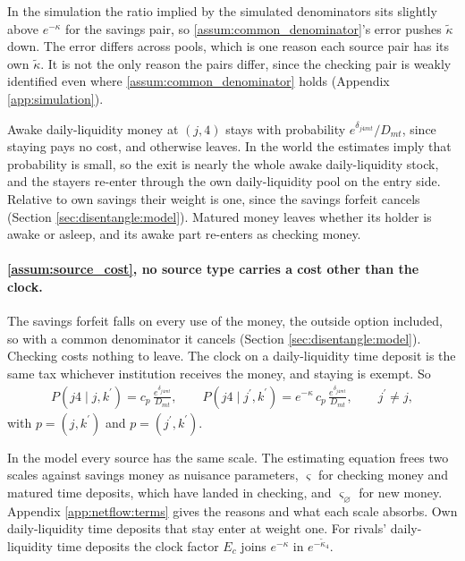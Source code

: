 In the simulation the ratio implied by the simulated denominators sits slightly above $e^{-\kappa}$ for the savings pair, so \ref{assum:common_denominator}'s error pushes $\tilde{\kappa}$ down. The error differs across pools, which is one reason each source pair has its own $\tilde{\kappa}$. It is not the only reason the pairs differ, since the checking pair is weakly identified even where \ref{assum:common_denominator} holds (Appendix \ref{app:simulation}).

Awake daily-liquidity money at $(j,4)$ stays with probability $e^{\delta_{j4mt}}/D_{mt}$, since staying pays no cost, and otherwise leaves. In the world the estimates imply that probability is small, so the exit is nearly the whole awake daily-liquidity stock, and the stayers re-enter through the own daily-liquidity pool on the entry side. Relative to own savings their weight is one, since the savings forfeit cancels (Section \ref{sec:disentangle:model}). Matured money leaves whether its holder is awake or asleep, and its awake part re-enters as checking money.

\paragraph{\ref{assum:source_cost}, no source type carries a cost other than the clock.} The savings forfeit falls on every use of the money, the outside option included, so with a common denominator it cancels (Section \ref{sec:disentangle:model}). Checking costs nothing to leave. The clock on a daily-liquidity time deposit is the same tax whichever institution receives the money, and staying is exempt. So
\begin{gather}
	P(j4\mid j,k^\prime)=c_{p}\,\frac{e^{\delta_{j4mt}}}{D_{mt}},\qquad
	P(j4\mid j^\prime,k^\prime)=e^{-\kappa}\,c_{p}\,\frac{e^{\delta_{j4mt}}}{D_{mt}},\qquad j^\prime\neq j, \label{eq:app_Pown}
\end{gather}
with $p=(j,k^\prime)$ and $p=(j^\prime,k^\prime)$.

In the model every source has the same scale. The estimating equation frees two scales against savings money as nuisance parameters, $\varsigma$ for checking money and matured time deposits, which have landed in checking, and $\varsigma_{\varnothing}$ for new money. Appendix \ref{app:netflow:terms} gives the reasons and what each scale absorbs. Own daily-liquidity time deposits that stay enter at weight one. For rivals' daily-liquidity time deposits the clock factor $E_c$ joins $e^{-\kappa}$ in $e^{-\tilde{\kappa}_4}$.

